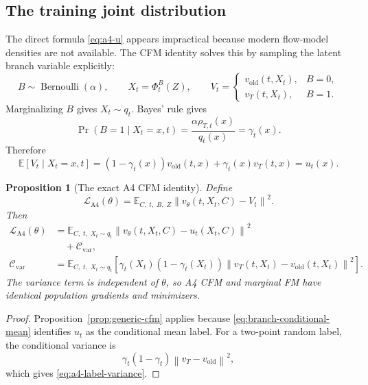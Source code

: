 \documentclass[11pt,a4paper]{article}
\newcommand{\E}{\mathbb{E}}
\newcommand{\norm}[1]{\left\lVert #1 \right\rVert}
\newcommand{\vold}{v_{\mathrm{old}}}
\newcommand{\vT}{v_T}
\newcommand{\vtheta}{v_\theta}
\theoremstyle{plain}
\newtheorem{proposition}[theorem]{Proposition}
\theoremstyle{definition}
\begin{document}
\subsection{The training joint distribution}

The direct formula \eqref{eq:a4-u} appears impractical because modern flow-model densities are not
available.  The CFM identity solves this by sampling the latent branch variable explicitly:
\begin{equation}
B\sim\operatorname{Bernoulli}(\alpha),
\qquad
X_t=\Phi_t^B(Z),
\qquad
V_t=
\begin{cases}
\vold(t,X_t), & B=0,\\
\vT(t,X_t), & B=1.
\end{cases}
\label{eq:branch-pair}
\end{equation}
Marginalizing $B$ gives $X_t\sim q_t$.  Bayes' rule gives
\begin{equation}
\Pr(B=1\mid X_t=x,t)
=
\frac{\alpha\rho_{T,t}(x)}{q_t(x)}
=\gamma_t(x).
\label{eq:branch-posterior}
\end{equation}
Therefore
\begin{equation}
\E[V_t\mid X_t=x,t]
=(1-\gamma_t(x))\vold(t,x)+\gamma_t(x)\vT(t,x)
=u_t(x).
\label{eq:branch-conditional-mean}
\end{equation}

\begin{proposition}[The exact A4 CFM identity]
\label{prop:a4-cfm}
Define
\begin{equation}
\mathcal L_{\mathrm{A4}}(\theta)
=
\E_{C,\;t,\;B,\;Z}
\norm{\vtheta(t,X_t,C)-V_t}^2.
\label{eq:a4-loss}
\end{equation}
Then
\begin{align}
\mathcal L_{\mathrm{A4}}(\theta)
&=
\E_{C,\;t,\;X_t\sim q_t}
\norm{\vtheta(t,X_t,C)-u_t(X_t,C)}^2
\nonumber\\
&\quad+
\mathcal C_{\mathrm{var}},
\label{eq:a4-loss-decomposition}\\
\mathcal C_{\mathrm{var}}
&=
\E_{C,\;t,\;X_t\sim q_t}
\left[
  \gamma_t(X_t)(1-\gamma_t(X_t))
  \norm{\vT(t,X_t)-\vold(t,X_t)}^2
\right].
\label{eq:a4-label-variance}
\end{align}
The variance term is independent of $\theta$, so A4 CFM and marginal FM have identical
population gradients and minimizers.
\end{proposition}

\begin{proof}
Proposition~\ref{prop:generic-cfm} applies because
\eqref{eq:branch-conditional-mean} identifies $u_t$ as the conditional mean label.  For a
two-point random label, the conditional variance is
\[
\gamma_t(1-\gamma_t)\norm{\vT-\vold}^2,
\]
which gives \eqref{eq:a4-label-variance}.
\end{proof}
\end{document}
